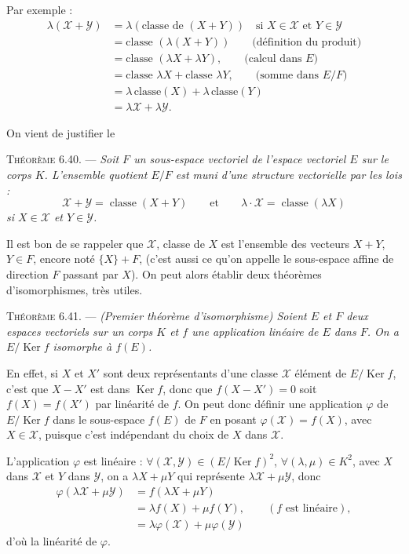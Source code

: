 Par exemple :
\begin{align*}
\lambda(\mathcal X+\mathcal Y)
&=\lambda(\text{classe de }(X+Y))\quad\text{si }X\in\mathcal X\text{ et }Y\in\mathcal Y\\
&=\text{classe }(\lambda(X+Y))\qquad\text{(définition du produit)}\\
&=\text{classe }(\lambda X+\lambda Y),\qquad\text{(calcul dans $E$)}\\
&=\text{classe }\lambda X+\text{classe }\lambda Y,\qquad\text{(somme dans $E/F$)}\\
&=\lambda\,\text{classe}(X)+\lambda\,\text{classe}(Y)\\
&=\lambda\mathcal X+\lambda\mathcal Y.
\end{align*}

On vient de justifier le

\medskip\noindent\textsc{Théorème 6.40.} --- \emph{Soit $F$ un sous-espace vectoriel de l'espace vectoriel $E$ sur le corps $K$. L'ensemble quotient $E/F$ est muni d'une structure vectorielle par les lois :
\[
\mathcal X+\mathcal Y=\operatorname{classe}(X+Y)\qquad\text{et}\qquad \lambda\cdot\mathcal X=\operatorname{classe}(\lambda X)
\]
si $X\in\mathcal X$ et $Y\in\mathcal Y$.}

Il est bon de se rappeler que $\mathcal X$, classe de $X$ est l'ensemble des vecteurs $X+Y$, $Y\in F$, encore noté $\{X\}+F$, (c'est aussi ce qu'on appelle le sous-espace affine de direction $F$ passant par $X$). On peut alors établir deux théorèmes d'isomorphismes, très utiles.

\medskip\noindent\textsc{Théorème 6.41.} --- \emph{(Premier théorème d'isomorphisme) Soient $E$ et $F$ deux espaces vectoriels sur un corps $K$ et $f$ une application linéaire de $E$ dans $F$. On a $E/\operatorname{Ker}f$ isomorphe à $f(E)$.}

En effet, si $X$ et $X'$ sont deux représentants d'une classe $\mathcal X$ élément de $E/\operatorname{Ker}f$, c'est que $X-X'$ est dans $\operatorname{Ker}f$, donc que $f(X-X')=0$ soit $f(X)=f(X')$ par linéarité de $f$. On peut donc définir une application $\varphi$ de $E/\operatorname{Ker}f$ dans le sous-espace $f(E)$ de $F$ en posant $\varphi(\mathcal X)=f(X)$, avec $X\in\mathcal X$, puisque c'est indépendant du choix de $X$ dans $\mathcal X$.

L'application $\varphi$ est linéaire : $\forall(\mathcal X,\mathcal Y)\in(E/\operatorname{Ker}f)^2$, $\forall(\lambda,\mu)\in K^2$, avec $X$ dans $\mathcal X$ et $Y$ dans $\mathcal Y$, on a $\lambda X+\mu Y$ qui représente $\lambda\mathcal X+\mu\mathcal Y$, donc
\begin{align*}
\varphi(\lambda\mathcal X+\mu\mathcal Y)&=f(\lambda X+\mu Y)\\
&=\lambda f(X)+\mu f(Y),\qquad(f\text{ est linéaire}),\\
&=\lambda\varphi(\mathcal X)+\mu\varphi(\mathcal Y)
\end{align*}
d'où la linéarité de $\varphi$.

